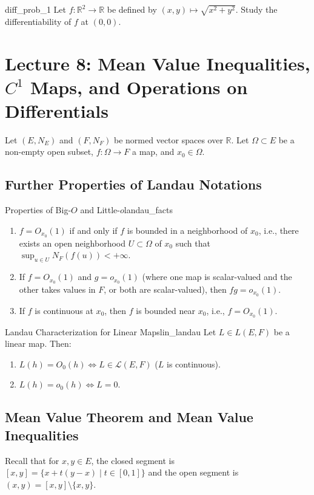 \documentclass[11pt, a4paper]{article}
\newcommand{\R}{\mathbb{R}}
\begin{document}
\begin{problem}{}{diff_prob_1}
Let $f: \R^2 \to \R$ be defined by $(x,y) \mapsto \sqrt{x^2+y^2}$. Study the differentiability of $f$ at $(0,0)$.
\end{problem}

\section{Lecture 8: Mean Value Inequalities, $C^1$ Maps, and Operations on Differentials}
Let $(E, N_E)$ and $(F, N_F)$ be normed vector spaces over $\R$. Let $\Omega \subset E$ be a non-empty open subset, $f: \Omega \to F$ a map, and $x_0 \in \Omega$.

\subsection{Further Properties of Landau Notations}
\begin{proposition}{Properties of Big-$O$ and Little-$o$}{landau_facts}
\begin{enumerate}
    \item $f = O_{x_0}(1)$ if and only if $f$ is bounded in a neighborhood of $x_0$, i.e., there exists an open neighborhood $U \subset \Omega$ of $x_0$ such that $\sup_{u \in U} N_F(f(u)) < +\infty$.
    \item If $f = O_{x_0}(1)$ and $g = o_{x_0}(1)$ (where one map is scalar-valued and the other takes values in $F$, or both are scalar-valued), then $fg = o_{x_0}(1)$.
    \item If $f$ is continuous at $x_0$, then $f$ is bounded near $x_0$, i.e., $f = O_{x_0}(1)$.
\end{enumerate}
\end{proposition}

\begin{proposition}{Landau Characterization for Linear Maps}{lin_landau}
Let $L \in L(E, F)$ be a linear map. Then:
\begin{enumerate}
    \item $L(h) = O_0(h) \iff L \in \mathcal{L}(E, F)$ ($L$ is continuous).
    \item $L(h) = o_0(h) \iff L = 0$.
\end{enumerate}
\end{proposition}

\subsection{Mean Value Theorem and Mean Value Inequalities}
Recall that for $x, y \in E$, the closed segment is $[x, y] = \{x + t(y - x) \mid t \in [0, 1]\}$ and the open segment is $(x, y) = [x, y] \setminus \{x, y\}$.
\end{document}
